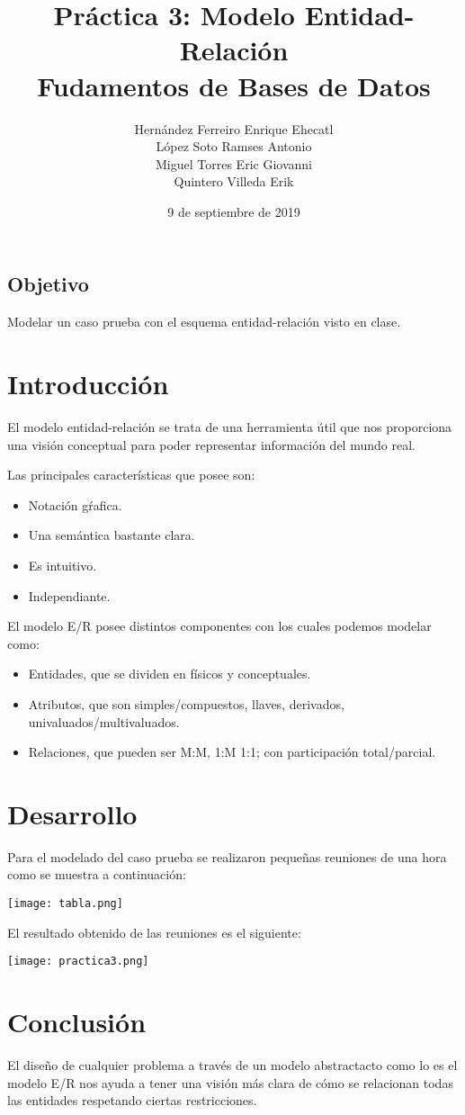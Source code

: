 \documentclass[12pt, letterpaper]{article}
\author{Hernández Ferreiro Enrique Ehecatl \\
        López Soto Ramses Antonio \\
        Miguel Torres Eric Giovanni \\
        Quintero Villeda Erik}
\title{Práctica 3: Modelo Entidad-Relación \\
       {\small Fudamentos de Bases de Datos}}
\date{9 de septiembre de 2019}
\begin{document}
    \maketitle

    \subsection*{Objetivo}
    Modelar un caso prueba con el esquema entidad-relación visto en clase.

    \section*{Introducción}
    El modelo entidad-relación se trata de una herramienta útil que nos
    proporciona una visión conceptual para poder representar información
    del mundo real. \vspace{.3cm}

    Las principales características que posee son:
    
    \begin{itemize}
        \item Notación gŕafica.
        \item Una semántica bastante clara.
        \item Es intuitivo.
        \item Independiante.
    \end{itemize}

    El modelo E/R posee distintos componentes con los cuales podemos modelar como:

    \begin{itemize}
        \item Entidades, que se dividen en físicos y conceptuales.
        \item Atributos, que son simples/compuestos, llaves, derivados, 
              univaluados/multivaluados.
        \item Relaciones, que pueden ser M:M, 1:M 1:1; con participación total/parcial.
    \end{itemize}

    \section*{Desarrollo}

    Para el modelado del caso prueba se realizaron pequeñas reuniones de una hora
    como se muestra a continuación: \vspace{.3cm}
 
        \texttt{[image: tabla.png]}
        
        El resultado obtenido de las reuniones es el siguiente: \vspace{.3cm}

        \texttt{[image: practica3.png]}
        
    \section*{Conclusión}
El diseño de cualquier problema a través de un modelo abstractacto como lo es el modelo E/R nos ayuda a tener una visión más clara de cómo
 se relacionan todas las entidades respetando ciertas restricciones.
\end{document}
